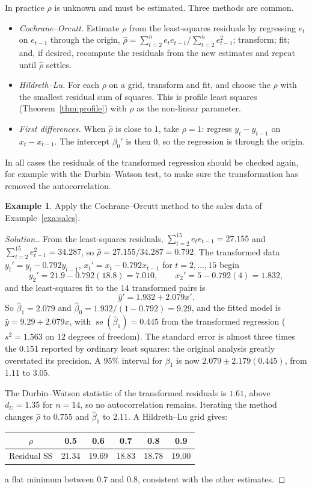 \documentclass[11pt,a4paper]{article}
\numberwithin{equation}{section}
\theoremstyle{definition}
\newtheorem{exa}[thm]{Example}
\newenvironment{solution}
  {\renewcommand{\qedsymbol}{}\begin{proof}[\textit{Solution}.]}
  {\end{proof}}
\begin{document}
In practice $\rho$ is unknown and must be estimated. Three methods are common.
\begin{itemize}
\item \emph{Cochrane--Orcutt.} Estimate $\rho$ from the least-squares residuals by regressing $e_t$ on $e_{t-1}$ through the
origin, $\hat\rho = \sum_{t=2}^ne_te_{t-1}/\sum_{t=2}^ne_{t-1}^2$; transform; fit; and, if desired, recompute the residuals from the new
estimates and repeat until $\hat\rho$ settles.
\item \emph{Hildreth--Lu.} For each $\rho$ on a grid, transform and fit, and choose the $\rho$ with the smallest residual
sum of squares. This is profile least squares (Theorem~\ref{thm:profile}) with $\rho$ as the non-linear parameter.
\item \emph{First differences.} When $\hat\rho$ is close to $1$, take $\rho = 1$: regress $y_t - y_{t-1}$ on $x_t - x_{t-1}$. The intercept $\beta_0'$
is then $0$, so the regression is through the origin.
\end{itemize}
In all cases the residuals of the transformed regression should be checked again, for example with the
Durbin--Watson test, to make sure the transformation has removed the autocorrelation.

\begin{exa}\label{exa:sales-co}
Apply the Cochrane--Orcutt method to the sales data of Example~\ref{exa:sales}.
\end{exa}

\begin{solution}
From the least-squares residuals, $\sum_{t=2}^{15}e_te_{t-1} = 27.155$ and $\sum_{t=2}^{15}e_{t-1}^2 = 34.287$, so
$\hat\rho = 27.155/34.287 = 0.792$. The transformed data $y_t' = y_t - 0.792y_{t-1}$, $x_t' = x_t - 0.792x_{t-1}$ for $t = 2, \dots, 15$ begin
\[
y_2' = 21.9 - 0.792(18.8) = 7.010 , \qquad x_2' = 5 - 0.792(4) = 1.832 ,
\]
and the least-squares fit to the $14$ transformed pairs is
\[
\hat y' = 1.932 + 2.079x' .
\]
So $\hat\beta_1 = 2.079$ and $\hat\beta_0 = 1.932/(1 - 0.792) = 9.29$, and the fitted model is $\hat y = 9.29 + 2.079x$, with
$\operatorname{se}(\hat\beta_1) = 0.445$ from the transformed regression ($s^2 = 1.563$ on $12$ degrees of freedom). The standard error is
almost three times the $0.151$ reported by ordinary least squares: the original analysis greatly overstated its
precision. A $95\%$ interval for $\beta_1$ is now $2.079 \pm 2.179(0.445)$, from $1.11$ to $3.05$.

The Durbin--Watson statistic of the transformed residuals is $1.61$, above $d_U = 1.35$ for $n = 14$, so no
autocorrelation remains. Iterating the method changes $\hat\rho$ to $0.755$ and $\hat\beta_1$ to $2.11$. A Hildreth--Lu grid gives:
\begin{center}
\begin{tabular}{cccccc}
$\rho$ & 0.5 & 0.6 & 0.7 & 0.8 & 0.9 \\
\hline
Residual SS & 21.34 & 19.69 & 18.83 & 18.78 & 19.00 \\
\end{tabular}
\end{center}
a flat minimum between $0.7$ and $0.8$, consistent with the other estimates.
\end{solution}
\end{document}
